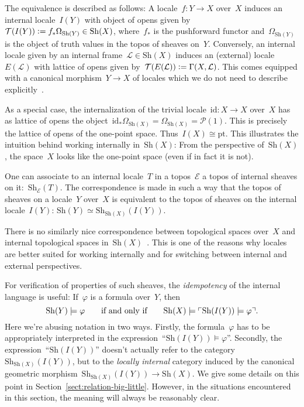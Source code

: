 \documentclass[10pt,reqno,a4paper]{amsbook}
\theoremstyle{definition}
\theoremstyle{plain}
\theoremstyle{remark}
\newcommand{\E}{\mathcal{E}}
\renewcommand{\L}{\mathcal{L}}
\renewcommand{\P}{\mathcal{P}}
\newcommand{\T}{\mathcal{T}}
\newcommand{\id}{\mathrm{id}}
\newcommand{\Sh}{\mathrm{Sh}}
\newcommand{\pt}{\mathrm{pt}}
\newcommand{\Open}{\T}
\newcommand{\?}{\,{:}\,}
\renewcommand{\_}{\mathpunct{.}\,}
\newcommand{\speak}[1]{\ulcorner\text{\textnormal{#1}}\urcorner}
\newcommand{\defeq}{\vcentcolon=}
\begin{document}
The equivalence is described as follows: A locale~$f : Y \to X$ over~$X$
induces an internal locale~$I(Y)$ with object of opens given by~$\Open(I(Y)) \defeq
f_* \Omega_{\Sh(Y)} \in \Sh(X)$, where~$f_*$ is the pushforward functor
and~$\Omega_{\Sh(Y)}$ is the object of truth values in the topos of sheaves
on~$Y$. Conversely, an internal locale given by an internal frame~$\L \in \Sh(X)$ induces an (external)
locale~$E(\L)$ with lattice of opens given by~$\Open(E(\L)) \defeq \Gamma(X,\L)$.
This comes equipped with a canonical morphism~$Y \to X$ of locales which we do
not need to describe explicitly~\cite[Section~C1.6]{johnstone:elephant}.

As a special case, the internalization of the trivial locale~$\id : X \to X$
over~$X$ has as lattice of opens the object~$\id_* \Omega_{\Sh(X)} =
\Omega_{\Sh(X)} = \P(1)$. This is precisely the lattice of opens of the
one-point space. Thus~$I(X) \cong \pt$. This illustrates the intuition
behind working internally in~$\Sh(X)$: From the perspective
of~$\Sh(X)$, the space~$X$ looks like the one-point space (even if in fact it
is not).

One can associate to an internal locale~$T$ in a topos~$\E$ a topos of internal
sheaves on it:~$\Sh_\E(T)$. The correspondence is made in such a way that the topos of
sheaves on a locale~$Y$ over~$X$ is equivalent to the topos of sheaves on the
internal locale~$I(Y)$: $\Sh(Y) \simeq \Sh_{\Sh(X)}(I(Y))$.

There is no similarly nice correspondence between topological spaces
over~$X$ and internal topological spaces
in~$\Sh(X)$~\cite[Corollary~C1.6.7]{johnstone:elephant}. This is one of the
reasons why locales are better suited for working internally and for switching
between internal and external perspectives.

For verification of properties of such sheaves, the \emph{idempotency} of the
internal language is useful: If~$\varphi$ is a formula over~$Y$, then
\[ \Sh(Y) \models \varphi \qquad\text{if and only if}\qquad
  \Sh(X) \models \speak{$\Sh(I(Y)) \models \varphi$}. \]
Here we're abusing notation in two ways. Firstly, the formula~$\varphi$ has to
be appropriately interpreted in the expression~``$\Sh(I(Y)) \models \varphi$''.
Secondly, the expression~``$\Sh(I(Y))$'' doesn't actually refer to the
category~$\Sh_{\Sh(X)}(I(Y))$, but to the \emph{locally internal} category induced by
the canonical geometric morphism~$\Sh_{\Sh(X)}(I(Y)) \to \Sh(X)$. We give some
details on this point in Section~\ref{sect:relation-big-little}. However, in
the situations encountered in this section, the meaning will always be
reasonably clear.
\end{document}
